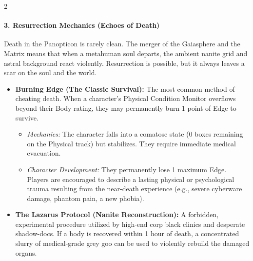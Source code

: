 \documentclass[
  oneside]{article}
\providecommand{\tightlist}{%
  \setlength{\itemsep}{0pt}\setlength{\parskip}{0pt}}
\begin{document}
\begin{multicols}{2}

\hypertarget{resurrection-mechanics-echoes-of-death}{%
\paragraph{3. Resurrection Mechanics (Echoes of
Death)}\label{resurrection-mechanics-echoes-of-death}}

Death in the Panopticon is rarely clean. The
merger of the Gaiasphere and the Matrix means that
when a metahuman soul departs, the ambient nanite
grid and astral background react violently.
Resurrection is possible, but it always leaves a
scar on the soul and the world.

\begin{itemize}
\tightlist
\item
  \textbf{Burning Edge (The Classic Survival):}
  The most common method of cheating death. When a
  character's Physical Condition Monitor overflows
  beyond their Body rating, they may permanently
  burn 1 point of Edge to survive.

  \begin{itemize}
  \tightlist
  \item
    \emph{Mechanics:} The character falls into a
    comatose state (0 boxes remaining on the
    Physical track) but stabilizes. They require
    immediate medical evacuation.
  \item
    \emph{Character Development:} They permanently
    lose 1 maximum Edge. Players are encouraged to
    describe a lasting physical or psychological
    trauma resulting from the near-death
    experience (e.g., severe cyberware damage,
    phantom pain, a new phobia).
  \end{itemize}
\item
  \textbf{The Lazarus Protocol (Nanite
  Reconstruction):} A forbidden, experimental
  procedure utilized by high-end corp black
  clinics and desperate shadow-docs. If a body is
  recovered within 1 hour of death, a concentrated
  slurry of medical-grade grey goo can be used to
  violently rebuild the damaged organs.


\end{itemize}
\end{multicols}
\end{document}
